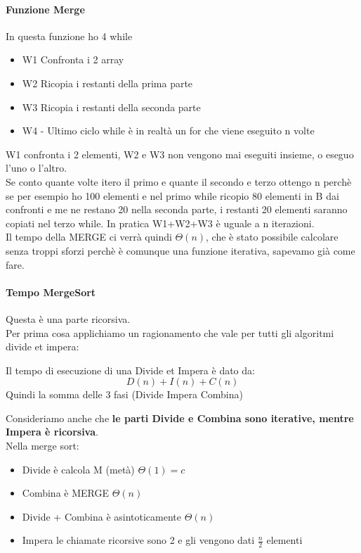 \paragraph*{Funzione Merge} In questa funzione ho 4 while
\begin{itemize}
    \item W1 Confronta i 2 array
    \item W2 Ricopia i restanti della prima parte
    \item W3 Ricopia i restanti della seconda parte
    \item W4 - Ultimo ciclo while è in realtà un for che viene eseguito n volte
\end{itemize}
W1 confronta i 2 elementi, W2 e W3 non vengono mai eseguiti insieme, o eseguo l'uno o l'altro.\\
Se conto quante volte itero il primo e quante il secondo e terzo ottengo n perchè se per
esempio ho 100 elementi e nel primo while ricopio 80 elementi in B dai confronti e me ne restano 20 
nella seconda parte, i restanti 20 elementi saranno copiati nel terzo while. In pratica W1+W2+W3 è uguale
a n iterazioni.\\
Il tempo della MERGE ci verrà quindi $\Theta(n)$, che è stato possibile calcolare senza troppi sforzi
perchè è comunque una funzione iterativa, sapevamo già come fare.
\paragraph*{Tempo MergeSort} Questa è una parte ricorsiva.\\
Per prima cosa applichiamo un ragionamento che vale per tutti gli algoritmi divide et impera:
\begin{center}
    Il tempo di esecuzione di una Divide et Impera è dato da:
    \begin{equation*}
        D(n)+I(n)+C(n)
    \end{equation*}
    Quindi la somma delle 3 fasi (Divide Impera Combina)
\end{center}
Consideriamo anche che \textbf{le parti Divide e Combina sono iterative, mentre Impera è ricorsiva}.\\
Nella merge sort:
\begin{itemize}
    \item Divide è calcola M (metà) $\Theta(1)=c$
    \item Combina è MERGE $\Theta(n)$
    \item Divide + Combina è asintoticamente $\Theta(n)$
    \item Impera le chiamate ricorsive sono 2 e gli vengono dati $\frac{n}{2}$ elementi
\end{itemize}
